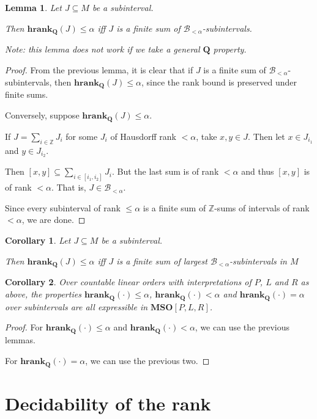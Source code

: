 \documentclass{article}
\newtheorem{corollary}{Corollary}
\newtheorem{lemma}{Lemma}
\newcommand{\hrank}[1]{\mathbf{hrank}_{\qq}\left( #1 \right)}
\newcommand{\mso}{\mathbf{MSO}}
\newcommand{\qq}{\mathbf{Q}}
\newcommand{\ZZ}{\mathbb{Z}}
\begin{document}
\begin{lemma}
  Let $J \subseteq M$ be a subinterval.

  Then $\hrank{J} \le \alpha$ iff $J$ is a finite sum of $\mathcal{B}_{< \alpha}$-subintervals.

  Note: this lemma does not work if we take a general $\qq$ property.
\end{lemma}

\begin{proof}
  From the previous lemma, it is clear that if $J$ is a finite sum of $\mathcal{B}_{< \alpha}$-subintervals,
  then $\hrank{J} \le \alpha$, since the rank bound is preserved under finite sums.

  Conversely, suppose $\hrank{J} \le \alpha$.

  If $J = \sum_{i \in \ZZ} J_i$ for some $J_i$ of Hausdorff rank $< \alpha$,
  take $x, y \in J$. Then let $x \in J_{i_1}$ and $y \in J_{i_2}$.

  Then $[x, y] \subseteq \sum_{i \in [i_1, i_2]} J_i$. But the last sum is of rank $< \alpha$
  and thus $[x, y]$ is of rank $< \alpha$. That is, $J \in \mathcal{B}_{< \alpha}$.

  Since every subinterval of rank $\le \alpha$ is a finite sum of $\ZZ$-sums of intervals of rank $< \alpha$,
  we are done.
\end{proof}

\begin{corollary}
  Let $J \subseteq M$ be a subinterval.

  Then $\hrank{J} \le \alpha$ iff $J$ is a finite sum of largest $\mathcal{B}_{< \alpha}$-subintervals in $M$
\end{corollary}

\begin{corollary}
  Over countable linear orders with interpretations of $P$, $L$ and $R$ as above, the properties
  $\hrank{\cdot} \le \alpha$, $\hrank{\cdot} < \alpha$ and $\hrank{\cdot} = \alpha$
  over subintervals are all expressible in $\mso[P, L, R]$.
\end{corollary}

\begin{proof}
  For $\hrank{\cdot} \le \alpha$ and $\hrank{\cdot} < \alpha$, we can use the previous lemmas.

  For $\hrank{\cdot} = \alpha$, we can use the previous two.
\end{proof}

\section{Decidability of the rank}
\end{document}
